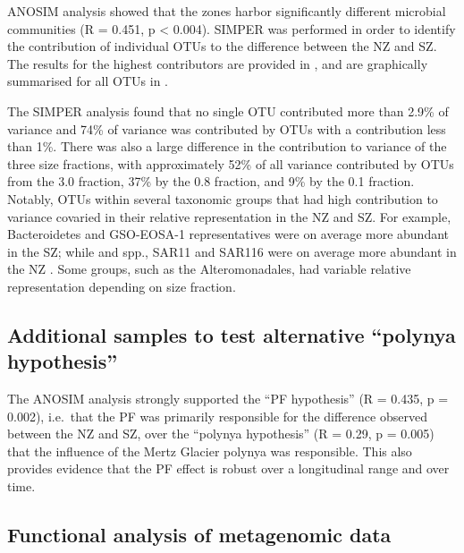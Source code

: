 \ac{ANOSIM} analysis showed that the zones harbor significantly different microbial communities (R = 0.451, p < 0.004). 
\ac{SIMPER} was performed in order to identify the contribution of individual \acp{OTU} to the difference between the \ac{NZ} and \ac{SZ}. 
The results for the highest contributors are provided in , and are graphically summarised for all \acp{OTU} in .




The \ac{SIMPER} analysis found that no single \ac{OTU} contributed more than 2.9\% of variance and 74\% of variance was contributed by \acp{OTU} with a contribution less than 1\%. 
There was also a large difference in the contribution to variance of the three size fractions, with approximately 52\% of all variance contributed by \acp{OTU} from the 3.0 \micron{} fraction, 37\% by the 0.8 \micron{} fraction, and 9\% by the 0.1 \micron{} fraction.
Notably, \acp{OTU} within several taxonomic groups that had high contribution to variance covaried in their relative representation in the \ac{NZ} and \ac{SZ}.
For example, Bacteroidetes and GSO-EOSA-1 representatives were on average more abundant in the \ac{SZ}; while  and  spp., SAR11 and SAR116 were on average more abundant in the \ac{NZ} .
Some groups, such as the Alteromonadales, had variable relative representation depending on size fraction.

\subsection{Additional samples to test alternative ``polynya hypothesis''}
The \ac{ANOSIM} analysis strongly supported the ``\ac{PF} hypothesis'' (R = 0.435, p = 0.002), i.e.\ that the \ac{PF} was primarily responsible for the difference observed between the \ac{NZ} and \ac{SZ}, over the ``polynya hypothesis'' (R = 0.29, p = 0.005) that the influence of the Mertz Glacier polynya was responsible.
This also provides evidence that the \ac{PF} effect is robust over a longitudinal range and over time.

\subsection{Functional analysis of metagenomic data}

